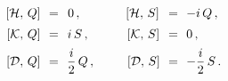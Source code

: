 \begin{equation}\label{boro3.3}
\begin{array}{rcccl}
[{\cal H},\,Q]\!\!& =&\!\!0\,, \qquad\quad\;\;[{\cal H},\,S]\!\!&=&\!\!-i\,Q\,,
\\[5pt]
[{\cal K},\,Q]\!\!&=&\!\!i\,S\,,\qquad\quad [{\cal K},\,S]\!\!&=&\!\!0\,,
\\[5pt]
[{\cal D},\,Q]\!\!&=&\!\!\displaystyle{\frac{i}{2}}\,Q\,,\qquad\;\;
[{\cal D},\,S]\!\!&=&\!\!-\displaystyle{\frac{i}{2}}\,S \, .
\end{array}
\end{equation}

